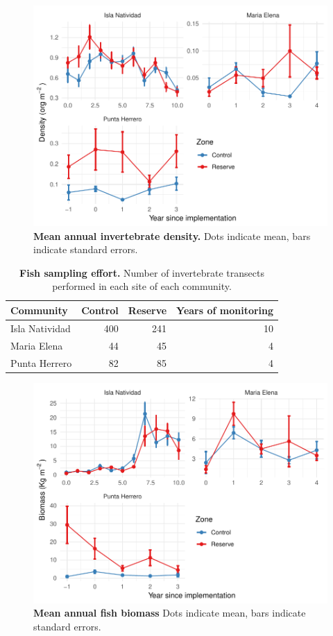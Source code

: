 \documentclass[10pt]{article}
\begin{document}
\begin{figure}[h]
\centering
\includegraphics{img/S2_fig.pdf}
\caption{{\bf Mean annual invertebrate density.} Dots indicate mean, bars indicate standard errors.}
\end{figure}

\begin{table}[h]
\caption{{\bf Fish sampling effort.} Number of invertebrate transects performed in each site of each community.}
\centering
\begin{tabular}{lrrr}
\toprule
Community & Control & Reserve & Years of monitoring\\
\midrule
Isla Natividad & 400 & 241 & 10\\
Maria Elena & 44 & 45 & 4\\
Punta Herrero & 82 & 85 & 4\\
\bottomrule
\end{tabular}
\end{table}

\clearpage

\begin{figure}[h]
\centering
\includegraphics{img/S3_fig.pdf}
\caption{{\bf Mean annual fish biomass} Dots indicate mean, bars indicate standard errors.}
\end{figure}
\end{document}
